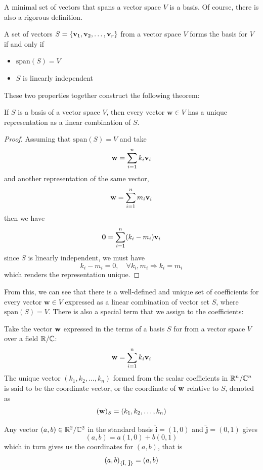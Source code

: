 \documentclass[12pt]{article}
\begin{document}
A minimal set of vectors that spans a vector space $V$ is a basis. Of course, there is also a rigorous definition.

\begin{definition}[Basis]
    A set of vectors $S = \{\mathbf{v}_1, \mathbf{v}_2, \ldots, \mathbf{v}_r\}$ from a vector space $V$ forms the basis for $V$ if and only if 
    \begin{itemize}
        \item $\text{span}(S) = V$
        \item $S$ is linearly independent
    \end{itemize}
\end{definition}

These two properties together construct the following theorem:

\begin{theorem}
    If $S$ is a basis of a vector space $V$, then every vector $\mathbf{w} \in V$ has a unique representation as a linear combination of $S$. 
\end{theorem}

\begin{proof}
    Assuming that $\text{span}(S) = V$ and take 
    $$\mathbf{w} = \sum_{i=1}^{n}k_i \mathbf{v}_i$$
    and another representation of the same vector, 
    $$\mathbf{w} = \sum_{i=1}^{n}m_i \mathbf{v}_i$$
    then we have 
    $$\mathbf{0} = \sum_{i=1}^{n} (k_i - m_i) \mathbf{v}_i$$
    since $S$ is linearly independent, we must have $$k_i - m_i = 0, \quad \forall k_i, m_i \Rightarrow k_i = m_i$$
    which renders the representation unique.
\end{proof}

From this, we can see that there is a well-defined and unique set of coefficients for every vector $\mathbf{w} \in V$ expressed as a linear combination of vector set $S$, where $\text{span}(S) = V$. There is also a special term that we assign to the coefficients:

\begin{definition}[Coordinate]
    Take the vector $\mathbf{w}$ expressed in the terms of a basis $S$ for from a vector space $V$ over a field $\mathbb{R}/\mathbb{C}$:
    $$\mathbf{w} = \sum_{i=1}^{n}k_i \mathbf{v}_i$$
    The unique vector $(k_1, k_2, \ldots, k_n)$ formed from the scalar coefficients in $\mathbb{R}^n/\mathbb{C}^n$ is said to be the coordinate vector, or the coordinate of $\mathbf{w}$ relative to $S$, denoted as $$(\mathbf{w})_S = (k_1, k_2, \ldots, k_n)$$
\end{definition}

\begin{example}
    Any vector $(a, b) \in \mathbb{R}^2/\mathbb{C}^2$ in the standard basis $\mathbf{\hat{i}} = (1, 0)$ and $\mathbf{\hat{j}} = (0, 1)$ gives 
    $$(a, b) = a(1, 0) + b(0, 1)$$ which in turn gives us the coordinates for $(a, b)$, that is 
    $$(a, b)_{\{\mathbf{\hat{i}},\ \mathbf{\hat{j}}\}} = (a, b)$$
\end{example}
\end{document}
